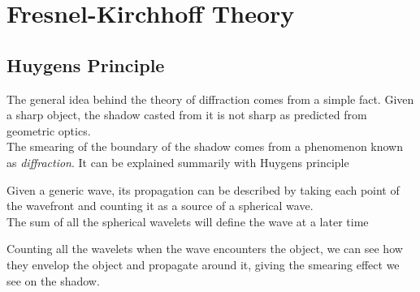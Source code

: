 \documentclass[../electromagnetism.tex]{subfiles}
\begin{document}
\section{Fresnel-Kirchhoff Theory}
\subsection{Huygens Principle}
The general idea behind the theory of diffraction comes from a simple fact. Given a sharp object, the shadow casted from it is not sharp as predicted from geometric optics.\\
The smearing of the boundary of the shadow comes from a phenomenon known as \emph{diffraction}. It can be explained summarily with Huygens principle
\begin{pri}[Huygens]
	Given a generic wave, its propagation can be described by taking each point of the wavefront and counting it as a source of a spherical wave.\\
	The sum of all the spherical wavelets will define the wave at a later time
\end{pri}
Counting all the wavelets when the wave encounters the object, we can see how they envelop the object and propagate around it, giving the smearing effect we see on the shadow.
\end{document}
